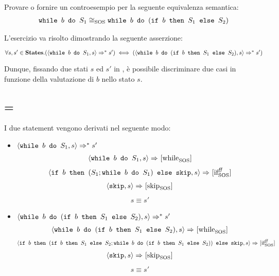 
{Provare o fornire un controesempio per la seguente equivalenza semantica:
\begin{align*}
\wbS{b}{S_1} \eqSOS \wbS{b}{(\ifABC{b}{S_1}{S_2})}
\end{align*}}
{}

L'esercizio va risolto dimostrando la seguente asserzione:

$\forall{s,s'} \in \states.
  (\confSs{\wbS{b}{S_1}}{s} \Rar{*} s')
  \iff
  (\confSs{\wbS{b}{(\ifABC{b}{S_1}{S_2})}}{s} \Rar{*} s')
$

Dunque, fissando due stati $s$ ed $s'$ in \states, è possibile discriminare due
casi in funzione della valutazione di $b$ nello stato $s$.

\subsection{ = \semfalse}
I due statement vengono derivati nel seguente modo:

\begin{itemize}
  \item $\confSs{\wbS{b}{S_1}}{s} \Rar{*} s'$
\begin{align*}
\confSs{\wbS{b}{S_1}}{s} \Rar{}
\whileSOS
\end{align*}
\begin{align*}
\confSs{\ifABC{b}{(S_1;\wbS{b}{S_1})}{\skipForFriends}}{s} \Rar{}
\ifffSOS
\end{align*}
\begin{align*}
\confSs{\skipForFriends}{s} \Rar{}
\skipSOS
\end{align*}
\begin{align*}
s \equiv s'
\end{align*}
  \item $\confSs{\wbS{b}{(\ifABC{b}{S_1}{S_2})}}{s} \Rar{*} s'$
\begin{align*}
\confSs{\wbS{b}{(\ifABC{b}{S_1}{S_2})}}{s} \Rar{}
\whileSOS
\end{align*}
\begin{align*}
\confSs{\ifABC{b}
              {(\ifABC{b}{S_1}{S_2}; \wbS{b}{(\ifABC{b}{S_1}{S_2})})}
              {\skipForFriends}}
       {s} \Rar{}
\ifffSOS
\end{align*}
\begin{align*}
\confSs{\skipForFriends}{s} \Rar{}
\skipSOS
\end{align*}
\begin{align*}
s \equiv s'
\end{align*}
\end{itemize}

